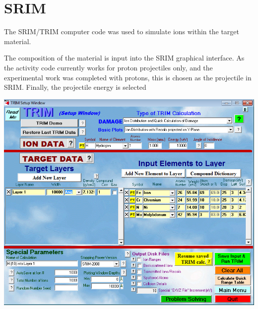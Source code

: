 
\section{SRIM}

The SRIM/TRIM computer code was used to simulate ions within the target material.

The composition of the material is input into the SRIM graphical interface.  As the activity code currently works for proton projectiles only, and the experimental work was completed with protons, this is chosen as the projectile in SRIM.  Finally, the projectile energy is selected



\begin{center}
\includegraphics[scale=0.35]{chapters/methodology_activity/images/trim.png}
\end{center}




